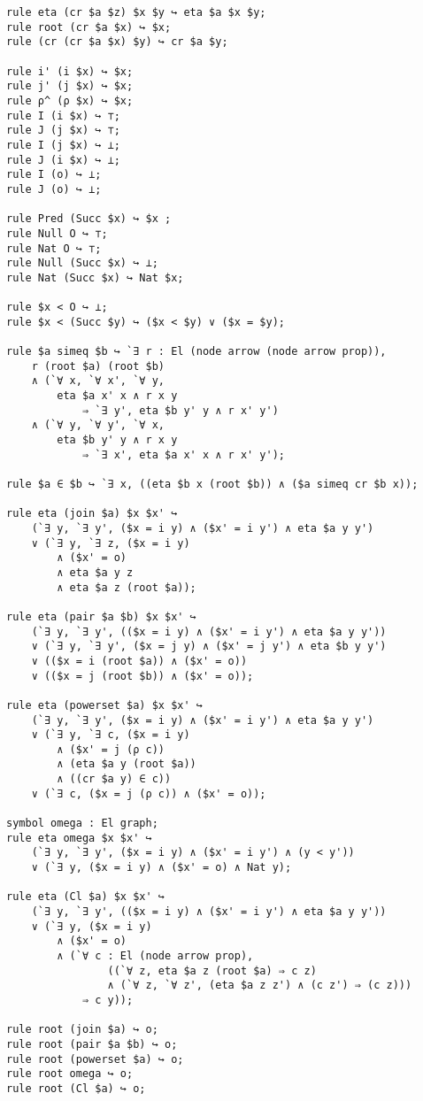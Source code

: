 \documentclass[a4paper]{article}
\begin{document}
\begin{lstlisting}
rule eta (cr $a $z) $x $y ↪ eta $a $x $y;
rule root (cr $a $x) ↪ $x;
rule (cr (cr $a $x) $y) ↪ cr $a $y;

rule i' (i $x) ↪ $x;
rule j' (j $x) ↪ $x;
rule ρ^ (ρ $x) ↪ $x;
rule I (i $x) ↪ ⊤;
rule J (j $x) ↪ ⊤;
rule I (j $x) ↪ ⊥;
rule J (i $x) ↪ ⊥;
rule I (o) ↪ ⊥;
rule J (o) ↪ ⊥;

rule Pred (Succ $x) ↪ $x ;
rule Null O ↪ ⊤;
rule Nat O ↪ ⊤;
rule Null (Succ $x) ↪ ⊥;
rule Nat (Succ $x) ↪ Nat $x;

rule $x < O ↪ ⊥;
rule $x < (Succ $y) ↪ ($x < $y) ∨ ($x = $y);

rule $a simeq $b ↪ `∃ r : El (node arrow (node arrow prop)), 
    r (root $a) (root $b)
    ∧ (`∀ x, `∀ x', `∀ y, 
        eta $a x' x ∧ r x y
            ⇒ `∃ y', eta $b y' y ∧ r x' y')
    ∧ (`∀ y, `∀ y', `∀ x, 
        eta $b y' y ∧ r x y
            ⇒ `∃ x', eta $a x' x ∧ r x' y');

rule $a ∈ $b ↪ `∃ x, ((eta $b x (root $b)) ∧ ($a simeq cr $b x));

rule eta (join $a) $x $x' ↪ 
	(`∃ y, `∃ y', ($x = i y) ∧ ($x' = i y') ∧ eta $a y y')
    ∨ (`∃ y, `∃ z, ($x = i y) 
    	∧ ($x' = o) 
    	∧ eta $a y z 
    	∧ eta $a z (root $a));

rule eta (pair $a $b) $x $x' ↪ 
	(`∃ y, `∃ y', (($x = i y) ∧ ($x' = i y') ∧ eta $a y y'))
    ∨ (`∃ y, `∃ y', ($x = j y) ∧ ($x' = j y') ∧ eta $b y y')
    ∨ (($x = i (root $a)) ∧ ($x' = o))
    ∨ (($x = j (root $b)) ∧ ($x' = o));

rule eta (powerset $a) $x $x' ↪ 
	(`∃ y, `∃ y', ($x = i y) ∧ ($x' = i y') ∧ eta $a y y')
    ∨ (`∃ y, `∃ c, ($x = i y) 
    	∧ ($x' = j (ρ c)) 
    	∧ (eta $a y (root $a)) 
    	∧ ((cr $a y) ∈ c))
    ∨ (`∃ c, ($x = j (ρ c)) ∧ ($x' = o));

symbol omega : El graph;
rule eta omega $x $x' ↪ 
	(`∃ y, `∃ y', ($x = i y) ∧ ($x' = i y') ∧ (y < y'))
    ∨ (`∃ y, ($x = i y) ∧ ($x' = o) ∧ Nat y);

rule eta (Cl $a) $x $x' ↪ 
	(`∃ y, `∃ y', (($x = i y) ∧ ($x' = i y') ∧ eta $a y y'))
    ∨ (`∃ y, ($x = i y) 
        ∧ ($x' = o)
        ∧ (`∀ c : El (node arrow prop), 
                ((`∀ z, eta $a z (root $a) ⇒ c z)
                ∧ (`∀ z, `∀ z', (eta $a z z') ∧ (c z') ⇒ (c z)))
            ⇒ c y));
            
rule root (join $a) ↪ o;
rule root (pair $a $b) ↪ o;
rule root (powerset $a) ↪ o;
rule root omega ↪ o;
rule root (Cl $a) ↪ o;

\end{lstlisting}
\end{document}

